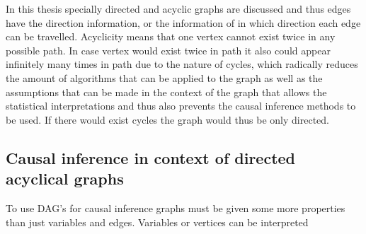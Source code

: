 \documentclass[main=english,12pt,a4paper,pdftex,econ,utf8]{aaltothesis}
\begin{document}


In this thesis specially directed and acyclic graphs are discussed and thus edges have the direction information, or the information of in which direction each edge can be travelled. Acyclicity means that one vertex cannot exist twice in any possible path. In case vertex would exist twice in path it also could appear infinitely many times in path due to the nature of cycles, which radically reduces the amount of algorithms that can be applied to the graph as well as the assumptions that can be made in the context of the graph that allows the statistical interpretations and thus also prevents the causal inference methods to be used. If there would exist cycles the graph would thus be only directed.

\subsection{Causal inference in context of directed acyclical graphs}

To use DAG's for causal inference graphs must be given some more properties than just variables and edges. Variables or vertices can be interpreted

\clearpage

\printbibliography
\end{document}
